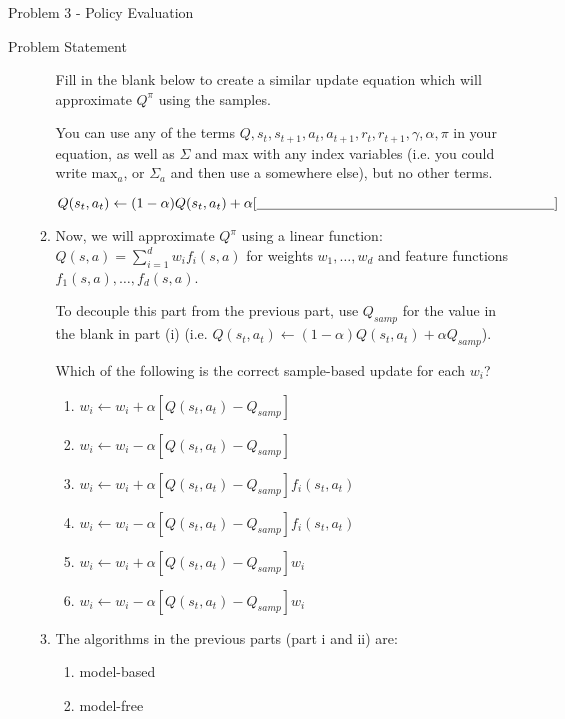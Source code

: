 \begin{problem}{Problem 3 - Policy Evaluation}
\begin{statement}{Problem Statement}
\begin{enumerate}[label=(\alph*)]
\begin{enumerate}[label=(\roman*)]
                \noindent Fill in the blank below to create a similar update equation which will approximate $Q^{\pi}$ using the samples.

                \noindent You can use any of the terms $Q, s_{t}, s_{t+1}, a_{t}, a_{t+1}, r_{t}, r_{t+1}, \gamma, \alpha, \pi$ in your equation, as well as $\Sigma$ and max with any index variables 
                (i.e. you could write $\text{max}_{a}$, or $\Sigma_{a}$ and then use a somewhere else), but no other terms.

                \begin{equation*}
                    Q(s_{t}, a_{t}) \leftarrow (1 - \alpha)Q(s_{t}, a_{t}) + \alpha [\text{\underline{\hspace*{7.5cm}}}]
                \end{equation*}
                \item Now, we will approximate $Q^{\pi}$ using a linear function: $Q(s, a) = \sum^{d}_{i = 1} w_{i}f_{i}(s, a)$ for weights $w_{1}, \dots , w_{d}$ and feature functions $f_{1}(s, a), \dots , f_{d}(s, a)$.
                
                \noindent To decouple this part from the previous part, use $Q_{samp}$ for the value in the blank in part (i) (i.e. $Q(s_{t}, a_{t}) \leftarrow (1 - \alpha)Q(s_{t}, a_{t}) + \alpha Q_{samp}$).

                \noindent Which of the following is the correct sample-based update for each $w_{i}$?

                \begin{enumerate}[label=\(\circ\)]
                    \item $w_{i} \leftarrow w_{i} + \alpha [Q(s_{t}, a_{t}) - Q_{samp}]$
                    \item $w_{i} \leftarrow w_{i} - \alpha [Q(s_{t}, a_{t}) - Q_{samp}]$
                    \item $w_{i} \leftarrow w_{i} + \alpha [Q(s_{t}, a_{t}) - Q_{samp}]f_{i}(s_{t}, a_{t})$
                    \item $w_{i} \leftarrow w_{i} - \alpha [Q(s_{t}, a_{t}) - Q_{samp}]f_{i}(s_{t}, a_{t})$
                    \item $w_{i} \leftarrow w_{i} + \alpha [Q(s_{t}, a_{t}) - Q_{samp}]w_{i}$
                    \item $w_{i} \leftarrow w_{i} - \alpha [Q(s_{t}, a_{t}) - Q_{samp}]w_{i}$
                \end{enumerate}
                \item The algorithms in the previous parts (part i and ii) are:
                \begin{enumerate}[label=\(\circ\)]
                    \item model-based
                    \item model-free
                \end{enumerate}
            \end{enumerate}
        \end{enumerate}
    \end{statement}


\end{problem}

